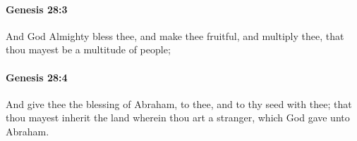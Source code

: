 		\paragraph{Genesis 28:3} %
			\label{GENESIS-28-3}

			And God Almighty bless thee, and make thee fruitful, and multiply thee, that thou mayest be a multitude of people;


		\paragraph{Genesis 28:4} %
			\label{GENESIS-28-4}

			And give thee the blessing of Abraham, to thee, and to thy seed with thee; that thou mayest inherit the land wherein thou art a stranger, which God gave unto Abraham.


